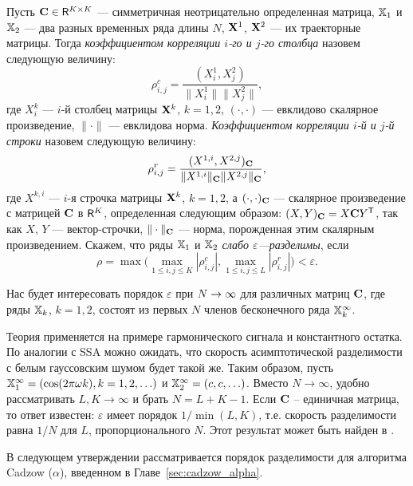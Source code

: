 \documentclass[12pt, specialist, subf,href,colorlinks=true,substylefile = spbu.rtx]{disser}
\theoremstyle{remark}
\theoremstyle{definition}
\begin{document}
Пусть $\mathbf{C} \in \mathsf{R}^{K \times K}$ --- симметричная неотрицательно определенная матрица, $\mathbb{X}_1$ и $\mathbb{X}_2$ ---  два разных временных ряда длины $N$, $\mathbf{X}^1$, $\mathbf{X}^2$ --- их траекторные матрицы. Тогда \emph{коэффициентом корреляции $i$-го и $j$-го столбца} назовем следующую величину:
\begin{equation}\label{col_corr}
\rho^c_{i,j} = \frac{(X^1_i, X^2_j)}{\|X^1_i\| \|X^2_j\|},
\end{equation}
где $X^k_i$ --- $i$-й столбец матрицы $\mathbf{X}^k$, $k = 1, 2$, $(\cdot, \cdot)$ --- евклидово скалярное произведение, $\|\cdot\|$ --- евклидова норма. \emph{Коэффициентом корреляции $i$-й и $j$-й строки} назовем следующую величину:
\begin{equation}\label{row_corr}
\rho^r_{i,j} = \frac{(X^{1,i}, X^{2,j})_{\mathbf{C}}}{\|X^{1,i}\|_{\mathbf{C}} \|X^{2,j}\|_{\mathbf{C}}},
\end{equation}
где $X^{k,i}$ --- $i$-я строчка матрицы $\mathbf{X}^k$, $k = 1, 2$, а $(\cdot, \cdot)_{\mathbf{C}}$ --- скалярное произведение с матрицей $\mathbf{C}$ в $\mathsf{R}^K$, определенная следующим образом: $(X, Y)_{\mathbf{C}} = X \mathbf{C} Y^{\mathsf{T}}$, так как $X$, $Y$ --- вектор-строчки, $\| \cdot \|_{\mathbf{C}}$ --- норма, порожденная этим скалярным произведением. Скажем, что ряды $\mathbb{X}_1$ и $\mathbb{X}_2$ \emph{слабо $\varepsilon$---разделимы}, если
\begin{equation}\label{weak_sep_eq}
\rho = \max\Big(\max_{1 \le i,j \le K}|\rho^c_{i,j}|, \max_{1 \le i,j \le L}|\rho^r_{i,j}|\Big) < \varepsilon.
\end{equation}

Нас будет интересовать порядок $\varepsilon$ при $N\rightarrow \infty$ для различных матриц $\mathbf{C}$, где ряды $\mathbb{X}_k$, $k=1,2$, состоят из первых $N$ членов бесконечного ряда $\mathbb{X}_k^\infty$.

Теория применяется на примере гармонического сигнала и константного остатка. По аналогии с SSA можно ожидать, что скорость асимптотической разделимости с белым гауссовским шумом будет такой же.
Таким образом, пусть
$\mathbb{X}_1^\infty = (\cos(2 \pi \omega k), k = 1, 2, \ldots)$ и  $\mathbb{X}_2^\infty = (c, c, \ldots)$. Вместо $N \to \infty$, удобно рассматривать $L,K \to \infty$ и брать $N = L + K - 1$. Если $\mathbf{C}$ -- единичная матрица, то ответ известен: $\varepsilon$ имеет порядок $1/\min(L,K)$, т.е. скорость разделимости равна $1/N$ для $L$, пропорционального $N$.
Этот результат может быть найден в \cite[Глава 6.1]{Golyandina.etal2001}.

\smallskip
В следующем утверждении рассматривается порядок разделимости для алгоритма Cadzow ($\alpha$), введенном в Главе~\ref{sec:cadzow_alpha}.
\end{document}
